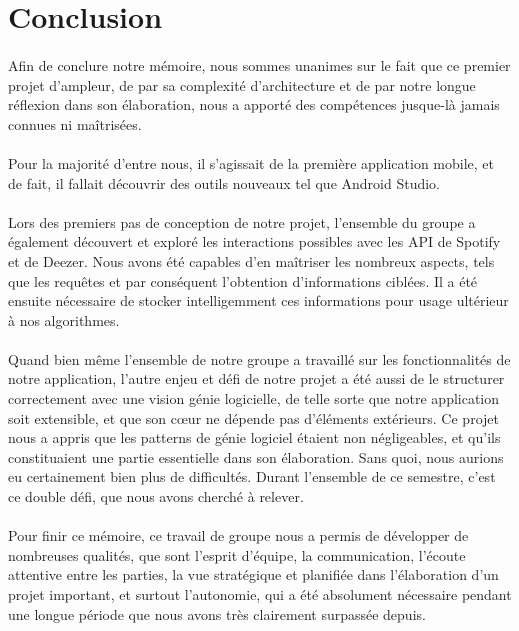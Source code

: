 \documentclass[12pt, openany]{report}
\begin{document}
\newpage
\section{Conclusion}

\paragraph{}Afin de conclure notre mémoire, nous sommes unanimes sur le fait que ce premier projet d'ampleur, de par sa complexité d'architecture et de par notre longue réflexion dans son élaboration, nous a apporté des compétences jusque-là jamais connues ni maîtrisées.

\paragraph{}Pour la majorité d'entre nous, il s'agissait de la première application mobile, et de fait, il fallait découvrir des outils nouveaux tel que Android Studio.

\paragraph{}Lors des premiers pas de conception de notre projet, l'ensemble du groupe a également découvert et exploré les interactions possibles avec les API de Spotify et de Deezer. Nous avons été capables d'en maîtriser les nombreux aspects, tels que les requêtes et par conséquent l'obtention d'informations ciblées. Il a été ensuite nécessaire de stocker intelligemment ces informations pour usage ultérieur à nos algorithmes.

\paragraph{}Quand bien même l'ensemble de notre groupe a travaillé sur les fonctionnalités de notre application, l'autre enjeu et défi de notre projet a été aussi de le structurer correctement avec une vision génie logicielle, de telle sorte que notre application soit extensible, et que son cœur ne dépende pas d'éléments extérieurs. Ce projet nous a appris que les patterns de génie logiciel étaient non négligeables, et qu'ils constituaient une partie essentielle dans son élaboration. Sans quoi, nous aurions eu certainement bien plus de difficultés. Durant l'ensemble de ce semestre, c'est ce double défi, que nous avons cherché à relever.

\paragraph{}Pour finir ce mémoire, ce travail de groupe nous a permis de développer de nombreuses qualités, que sont l'esprit d'équipe, la communication, l'écoute attentive entre les parties, la vue stratégique et planifiée dans l'élaboration d'un projet important, et surtout l'autonomie, qui a été absolument nécessaire pendant une longue période que nous avons très clairement surpassée depuis.
\end{document}
